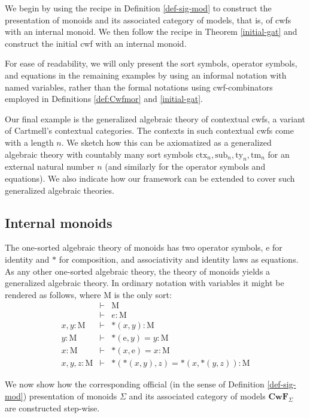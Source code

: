 \documentclass{mscs}
\newcommand{\FYI}[1]{{#1}}
\def\Cwf{\mathbf{CwF}}
\def\Mon{\mathrm{M}}
\def\idmon{\mathrm{e}}
\def\comp{\mathrm{*}}
\newcommand{\ctx}{\mathrm{ctx}}
\newcommand{\sub}{\mathrm{sub}}
\newcommand{\ty}{\mathrm{ty}}
\newcommand{\tm}{\mathrm{tm}}
\begin{document}
We begin by using the recipe in Definition \ref{def-sig-mod} to construct the \FYI{presentation of} monoids and its associated category of models, that is, of cwfs with an internal monoid. We then follow the recipe in Theorem \ref{initial-gat} and construct the initial cwf with an internal monoid.

For ease of readability, we will only present the sort symbols, operator symbols, and equations in the remaining examples by using an informal notation with named variables, rather than the formal notations using cwf-combinators employed in Definitions \ref{def:Cwfmor} and \ref{initial-gat}.

Our final example is the generalized algebraic theory of contextual cwfs, a variant of Cartmell's contextual categories. The contexts in such contextual cwfs come with a length $n$. We sketch how this can be axiomatized as a generalized algebraic theory with countably many sort symbols $\ctx_n, \sub_n, \ty_n, \tm_n$ for an external natural number $n$ (and similarly for the operator symbols and equations). We also indicate how our framework can be extended to cover such generalized algebraic theories.

\subsection{Internal monoids}\label{monoids}
 The one-sorted algebraic theory of monoids has two operator symbols,
$\idmon$ for identity and $\comp$ for composition, and associativity and identity laws as equations.
As any other one-sorted algebraic theory, the theory of monoids yields a
generalized algebraic theory. In ordinary notation with variables it might be rendered as follows, where $\Mon$ is the only sort:
\begin{eqnarray*}
&\vdash& \Mon\\
&\vdash& e : \Mon\\
x, y : \Mon &\vdash& \comp(x,y) : \Mon\\
y : \Mon &\vdash& \comp(\idmon,y) = y : \Mon\\
x : \Mon &\vdash& \comp(x,\idmon) = x : \Mon\\
x, y, z : \Mon &\vdash& \comp(\comp(x,y),z) = \comp(x,\comp(y,z)) : \Mon
\end{eqnarray*}

We now show how the corresponding official (in the sense of Definition \ref{def-sig-mod}) \FYI{presentation of} monoids $\Sigma$ and its associated category of models $\Cwf_\Sigma$ are constructed step-wise.
\end{document}
